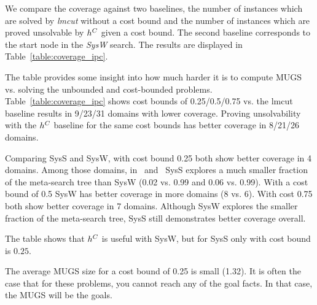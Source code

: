 We compare the coverage against two baselines, the number of instances which are solved by \emph{lmcut} without a cost bound and the number of instances which are proved unsolvable by $h^C$ given a cost bound. The second baseline corresponds to the start node in the \emph{SysW} search.
The results are displayed in Table~\ref{table:coverage_ipc}.

The table provides some insight into how much harder it is to compute MUGS vs. solving the unbounded and cost-bounded problems. Table~\ref{table:coverage_ipc} shows cost bounds of 0.25/0.5/0.75 vs. the lmcut baseline results in 9/23/31 domains with lower coverage.
Proving unsolvability with the $h^C$ baseline for the same cost bounds has better coverage in 8/21/26 domains.

Comparing SysS and SysW, with cost bound 0.25 both show better coverage in 4 domains. Among those domains, in \woodworking\ and \openstacks\ SysS explores a much smaller fraction of the meta-search tree than SysW (0.02 vs. 0.99 and 0.06 vs. 0.99). With a cost bound of 0.5 SysW has better coverage in more domains (8 vs. 6). With cost 0.75 both show better coverage in 7 domains. Although SysW explores the smaller fraction of the meta-search tree, SysS still demonstrates better coverage overall. 

The table shows that $h^C$ is useful with SysW, but for SysS only with cost bound is $0.25$.

The average MUGS size for a cost bound of 0.25 is small (1.32). It is often the case that for these problems, you cannot reach any of the goal facts. In that case, the MUGS will be the goals.


